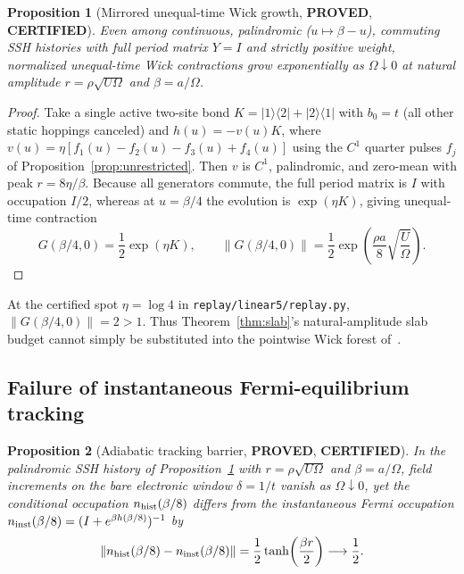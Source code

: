 \documentclass[11pt]{article}
\newtheorem{proposition}{Proposition}
\theoremstyle{remark}
\newcommand{\proved}{\textbf{PROVED}}
\newcommand{\certified}{\textbf{CERTIFIED}}
\begin{document}
\begin{proposition}[Mirrored unequal-time Wick growth, \proved, \certified]\label{prop:palindromic}
Even among continuous, palindromic ($u\mapsto\beta-u$), commuting SSH histories with full period matrix $Y=I$ and strictly positive weight, normalized unequal-time Wick contractions grow exponentially as $\Omega\downarrow 0$ at natural amplitude $r=\rho\sqrt{U\Omega}$ and $\beta=a/\Omega$.
\end{proposition}

\begin{proof}
Take a single active two-site bond $K=|1\rangle\langle 2|+|2\rangle\langle 1|$ with $b_0=t$ (all other static hoppings canceled) and $h(u)=-v(u)K$, where $v(u)=\eta[f_1(u)-f_2(u)-f_3(u)+f_4(u)]$ using the $C^1$ quarter pulses $f_j$ of Proposition~\ref{prop:unrestricted}. Then $v$ is $C^1$, palindromic, and zero-mean with peak $r=8\eta/\beta$. Because all generators commute, the full period matrix is $I$ with occupation $I/2$, whereas at $u=\beta/4$ the evolution is $\exp(\eta K)$, giving unequal-time contraction
\begin{equation}\label{eq:mirror-wick}
 G(\beta/4,0)=\frac{1}{2}\exp(\eta K),\qquad
 \|G(\beta/4,0)\|=\frac{1}{2}\exp\!\left(\frac{\rho a}{8}\sqrt{\frac{U}{\Omega}}\right).
\end{equation}
\end{proof}

At the certified spot $\eta=\log 4$ in \texttt{replay/linear5/replay.py}, $\|G(\beta/4,0)\|=2>1$. Thus Theorem~\ref{thm:slab}'s natural-amplitude slab budget cannot simply be substituted into the pointwise Wick forest of~\cite{linear4}.

\subsection{Failure of instantaneous Fermi-equilibrium tracking}

\begin{proposition}[Adiabatic tracking barrier, \proved, \certified]\label{prop:tracking}
In the palindromic SSH history of Proposition~\ref{prop:palindromic} with $r=\rho\sqrt{U\Omega}$ and $\beta=a/\Omega$, field increments on the bare electronic window $\delta=1/t$ vanish as $\Omega\downarrow 0$, yet the conditional occupation $n_{\rm hist}(\beta/8)$ differs from the instantaneous Fermi occupation $n_{\rm inst}(\beta/8)=(I+e^{\beta h(\beta/8)})^{-1}$ by
\begin{equation}\label{eq:tracking}
 \|n_{\rm hist}(\beta/8)-n_{\rm inst}(\beta/8)\|=\frac{1}{2}\tanh\!\left(\frac{\beta r}{2}\right)\longrightarrow \frac{1}{2}.
\end{equation}
\end{proposition}
\end{document}

